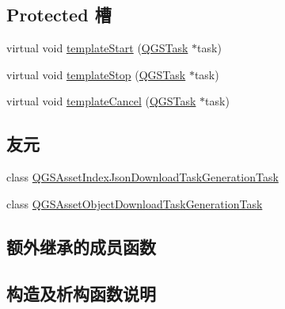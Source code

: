 \subsection*{Protected 槽}
\begin{DoxyCompactItemize}
\item 
virtual void \mbox{\hyperlink{class_q_g_s_asset_builder_ac466a8bf8bc09e3d5fa9cbbe61fd2bda}{template\+Start}} (\mbox{\hyperlink{class_q_g_s_task}{Q\+G\+S\+Task}} $\ast$task)
\item 
virtual void \mbox{\hyperlink{class_q_g_s_asset_builder_a7594ed3fad7fb4712ca51a5cb2676dc2}{template\+Stop}} (\mbox{\hyperlink{class_q_g_s_task}{Q\+G\+S\+Task}} $\ast$task)
\item 
virtual void \mbox{\hyperlink{class_q_g_s_asset_builder_ac841fdb6f4ce5ba8d6f5e280f8331ecb}{template\+Cancel}} (\mbox{\hyperlink{class_q_g_s_task}{Q\+G\+S\+Task}} $\ast$task)
\end{DoxyCompactItemize}
\subsection*{友元}
\begin{DoxyCompactItemize}
\item 
class \mbox{\hyperlink{class_q_g_s_asset_builder_a55bcd2e56af79527c162b7c2149701aa}{Q\+G\+S\+Asset\+Index\+Json\+Download\+Task\+Generation\+Task}}
\item 
class \mbox{\hyperlink{class_q_g_s_asset_builder_aec6e1c8ab10577e704203a6195bad762}{Q\+G\+S\+Asset\+Object\+Download\+Task\+Generation\+Task}}
\end{DoxyCompactItemize}
\subsection*{额外继承的成员函数}


\subsection{构造及析构函数说明}
\mbox{\label{class_q_g_s_asset_builder_a3377a93cb77f7181d6e4644f49f2ce56}} 
